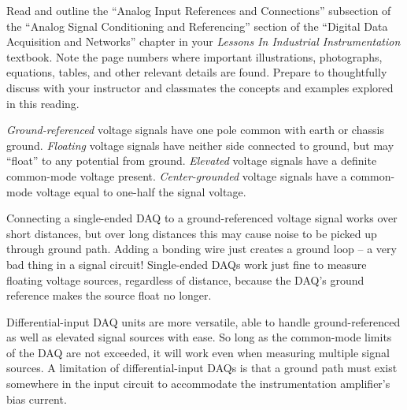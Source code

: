 

Read and outline the ``Analog Input References and Connections'' subsection of the ``Analog Signal Conditioning and Referencing'' section of the ``Digital Data Acquisition and Networks'' chapter in your {\it Lessons In Industrial Instrumentation} textbook.  Note the page numbers where important illustrations, photographs, equations, tables, and other relevant details are found.  Prepare to thoughtfully discuss with your instructor and classmates the concepts and examples explored in this reading.














{\it Ground-referenced} voltage signals have one pole common with earth or chassis ground.  {\it Floating} voltage signals have neither side connected to ground, but may ``float'' to any potential from ground.  {\it Elevated} voltage signals have a definite common-mode voltage present.  {\it Center-grounded} voltage signals have a common-mode voltage equal to one-half the signal voltage.

Connecting a single-ended DAQ to a ground-referenced voltage signal works over short distances, but over long distances this may cause noise to be picked up through ground path.  Adding a bonding wire just creates a ground loop -- a very bad thing in a signal circuit!  Single-ended DAQs work just fine to measure floating voltage sources, regardless of distance, because the DAQ's ground reference makes the source float no longer.

Differential-input DAQ units are more versatile, able to handle ground-referenced as well as elevated signal sources with ease.  So long as the common-mode limits of the DAQ are not exceeded, it will work even when measuring multiple signal sources.  A limitation of differential-input DAQs is that a ground path must exist somewhere in the input circuit to accommodate the instrumentation amplifier's bias current.









